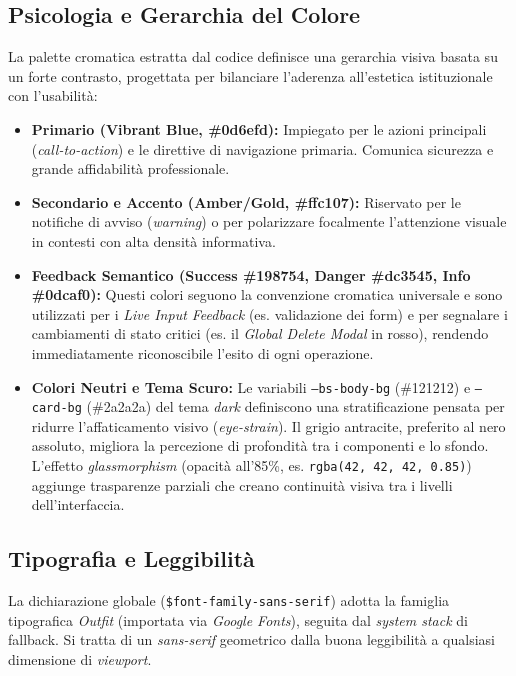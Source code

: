 \subsection{Psicologia e Gerarchia del Colore}
La palette cromatica estratta dal codice definisce una gerarchia visiva basata su un forte contrasto, progettata per bilanciare l'aderenza all'estetica istituzionale con l'usabilità:
\begin{itemize}
    \item \textbf{Primario (Vibrant Blue, \#0d6efd):} Impiegato per le azioni principali (\textit{call-to-action}) e le direttive di navigazione primaria. Comunica sicurezza e grande affidabilità professionale.
    \item \textbf{Secondario e Accento (Amber/Gold, \#ffc107):} Riservato per le notifiche di avviso (\textit{warning}) o per polarizzare focalmente l'attenzione visuale in contesti con alta densità informativa.
    \item \textbf{Feedback Semantico (Success \#198754, Danger \#dc3545, Info \#0dcaf0):} Questi colori seguono la convenzione cromatica universale e sono utilizzati per i \textit{Live Input Feedback} (es. validazione dei form) e per segnalare i cambiamenti di stato critici (es. il \textit{Global Delete Modal} in rosso), rendendo immediatamente riconoscibile l'esito di ogni operazione.
    \item \textbf{Colori Neutri e Tema Scuro:} Le variabili \texttt{--bs-body-bg} (\#121212) e \texttt{--card-bg} (\#2a2a2a) del tema \textit{dark} definiscono una stratificazione pensata per ridurre l'affaticamento visivo (\textit{eye-strain}). Il grigio antracite, preferito al nero assoluto, migliora la percezione di profondità tra i componenti e lo sfondo. L'effetto \textit{glassmorphism} (opacità all'85\%, es. \texttt{rgba(42, 42, 42, 0.85)}) aggiunge trasparenze parziali che creano continuità visiva tra i livelli dell'interfaccia.
\end{itemize}

\subsection{Tipografia e Leggibilità}
La dichiarazione globale (\texttt{\$font-family-sans-serif}) adotta la famiglia tipografica \textit{Outfit} (importata via \textit{Google Fonts}), seguita dal \textit{system stack} di fallback. Si tratta di un \textit{sans-serif} geometrico dalla buona leggibilità a qualsiasi dimensione di \textit{viewport}.

